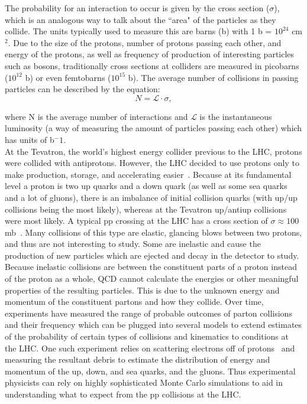 The probability for an interaction to occur is given by the cross section ($\sigma$), which is an analogous way to talk about the ``area" of the particles as they collide. The units typically used to measure this are barns (b) with 1 b = $10^{24}$ cm$^2$.  Due to the size of the protons, number of protons passing each other, and energy of the protons, as well as frequency of production of interesting particles such as bosons, traditionally cross sections at colliders are measured in picobarns ($10^{12}$ b) or even femtobarns ($10^{15}$ b). The average number of collisions in passing particles can be described by the equation:
\begin{equation}
\label{eq:lumi_xsec_relationship}
N = \mathcal{L} \cdot \sigma ,
\end{equation}

where N is the average number of interactions and $\mathcal{L}$ is the instantaneous luminosity (a way of measuring the amount of particles passing each other) which has units of b$^-1$.\\

At the Tevatron, the world's highest energy collider previous to the LHC, protons were collided with antiprotons. However, the LHC decided to use protons only to make production, storage, and accelerating easier~\cite{lhcmachine}. Because at its fundamental level a proton is two up quarks and a down quark (as well as some sea quarks and a lot of gluons), there is an imbalance of initial collision quarks (with up/up collisions being the most likely), whereas at the Tevatron up/antiup collisions were most likely. A typical pp crossing at the LHC has a cross section of $\sigma \approx 100$ mb~\cite{qcdprimer}. Many collisions of this type are elastic, glancing blows between two protons, and thus are not interesting to study. Some are inelastic and cause the production of new particles which are ejected and decay in the detector to study. Because inelastic collisions are between the constituent parts of a proton instead of the proton as a whole, QCD cannot calculate the energies or other meaningful properties of the resulting particles. This is due to the unknown energy and momentum of the constituent partons and how they collide. Over time, experiments have measured the range of probable outcomes of parton collisions and their frequency which can be plugged into several models to extend estimates of the probability of certain types of collisions and kinematics to conditions at the LHC. One such experiment relies on scattering electrons off of protons~\cite{halzen} and measuring the resultant debris to estimate the distribution of energy and momentum of the up, down, and sea quarks, and the gluons. Thus experimental physicists can rely on highly sophisticated Monte Carlo simulations to aid in understanding what to expect from the pp collisions at the LHC.




